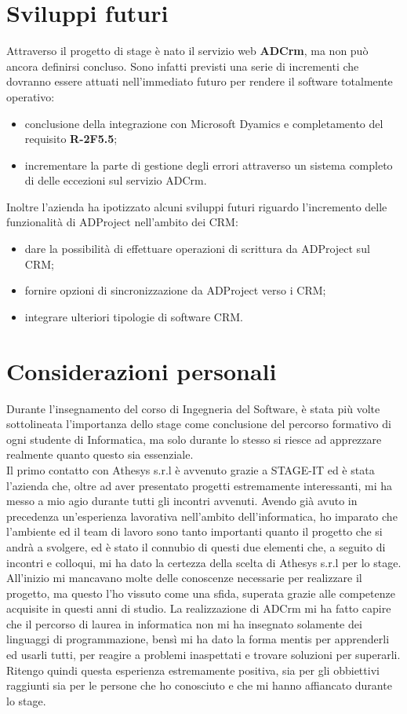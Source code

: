 \documentclass[12pt,a4paper,twoside,openany,english]{book}
\begin{document}
\section{Sviluppi futuri}
Attraverso il progetto di stage è nato il servizio web \textbf{ADCrm}, ma non può ancora definirsi concluso. Sono infatti previsti una serie di incrementi che dovranno essere attuati nell'immediato futuro per rendere il software totalmente operativo:
\begin{itemize}
	\item conclusione della integrazione con Microsoft Dyamics e completamento del requisito \textbf{R-2F5.5};
	\item incrementare la parte di gestione degli errori attraverso un sistema completo di  delle eccezioni sul servizio ADCrm.
\end{itemize}
Inoltre l'azienda ha ipotizzato alcuni sviluppi futuri riguardo l'incremento delle funzionalità di ADProject nell'ambito dei \gls{CRM}:
\begin{itemize}
	\item dare la possibilità di effettuare operazioni di scrittura da ADProject sul \gls{CRM};
	\item fornire opzioni di sincronizzazione da ADProject verso i \gls{CRM};
	\item integrare ulteriori tipologie di software \gls{CRM}.
\end{itemize}
\newpage
\section{Considerazioni personali}
Durante l'insegnamento del corso di Ingegneria del Software, è stata più volte sottolineata l'importanza dello stage come conclusione del percorso formativo di ogni studente di Informatica, ma solo durante lo stesso si riesce ad apprezzare realmente quanto questo sia essenziale.\\
Il primo contatto con Athesys s.r.l è avvenuto grazie a STAGE-IT ed è stata l'azienda che, oltre ad aver presentato progetti estremamente interessanti, mi ha messo a mio agio durante tutti gli incontri avvenuti. Avendo già avuto in precedenza un'esperienza lavorativa nell'ambito dell'informatica, ho imparato che l'ambiente ed il team di lavoro sono tanto importanti quanto il progetto che si andrà a svolgere, ed è stato il connubio di questi due elementi che, a seguito di incontri e colloqui, mi ha dato la certezza della scelta di Athesys s.r.l per lo stage.\\
All'inizio mi mancavano molte delle conoscenze necessarie per realizzare il progetto, ma questo l'ho vissuto come una sfida, superata grazie alle competenze acquisite in questi anni di studio. La realizzazione di ADCrm mi ha fatto capire che il percorso di laurea in informatica non mi ha insegnato solamente dei linguaggi di programmazione, bensì mi ha dato la forma mentis per apprenderli ed usarli tutti, per reagire a problemi inaspettati e trovare soluzioni per superarli.\\ 
Ritengo quindi questa esperienza estremamente positiva, sia per gli obbiettivi raggiunti sia per le persone che ho conosciuto e che mi hanno affiancato durante lo stage.
\end{document}
